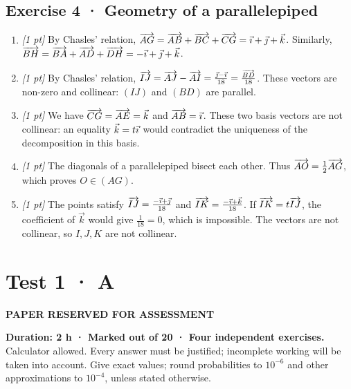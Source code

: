 \subsection*{Exercise 4 · Geometry of a parallelepiped}\begin{enumerate}

\item \textit{[1 pt]} By Chasles' relation, $\overrightarrow{AG}=\overrightarrow{AB}+\overrightarrow{BC}+\overrightarrow{CG}=\vec{\imath} +\vec{\jmath} +\vec k$. Similarly, $\overrightarrow{BH}=\overrightarrow{BA}+\overrightarrow{AD}+\overrightarrow{DH}=-\vec{\imath} +\vec{\jmath} +\vec k$.

\item \textit{[1 pt]} By Chasles' relation, $\overrightarrow{IJ}=\overrightarrow{AJ}-\overrightarrow{AI}=\frac{\vec{\jmath} -\vec{\imath} }{18}=\frac{\overrightarrow{BD}}{18}$. These vectors are non-zero and collinear: $(IJ)$ and $(BD)$ are parallel.

\item \textit{[1 pt]} We have $\overrightarrow{CG}=\overrightarrow{AE}=\vec k$ and $\overrightarrow{AB}=\vec{\imath} $. These two basis vectors are not collinear: an equality $\vec k=t\vec{\imath} $ would contradict the uniqueness of the decomposition in this basis.

\item \textit{[1 pt]} The diagonals of a parallelepiped bisect each other. Thus $\overrightarrow{AO}=\frac12\overrightarrow{AG}$, which proves $O\in(AG)$.

\item \textit{[1 pt]} The points satisfy $\overrightarrow{IJ}=\frac{-\vec{\imath} +\vec{\jmath} }{18}$ and $\overrightarrow{IK}=\frac{-\vec{\imath} +\vec k}{18}$. If $\overrightarrow{IK}=t\overrightarrow{IJ}$, the coefficient of $\vec k$ would give $\frac{1}{18}=0$, which is impossible. The vectors are not collinear, so $I,J,K$ are not collinear.

\end{enumerate}

\fi

\ifprof

\clearpage{}\label{sujet:1-3}

\section*{Test 1 · A}

{\sffamily\bfseries\color{amber}PAPER RESERVED FOR ASSESSMENT\par}

\textbf{Duration: 2 h · Marked out of 20 · Four independent exercises.}\\Calculator allowed. Every answer must be justified; incomplete working will be taken into account. Give exact values; round probabilities to $10^{-6}$ and other approximations to $10^{-4}$, unless stated otherwise.

